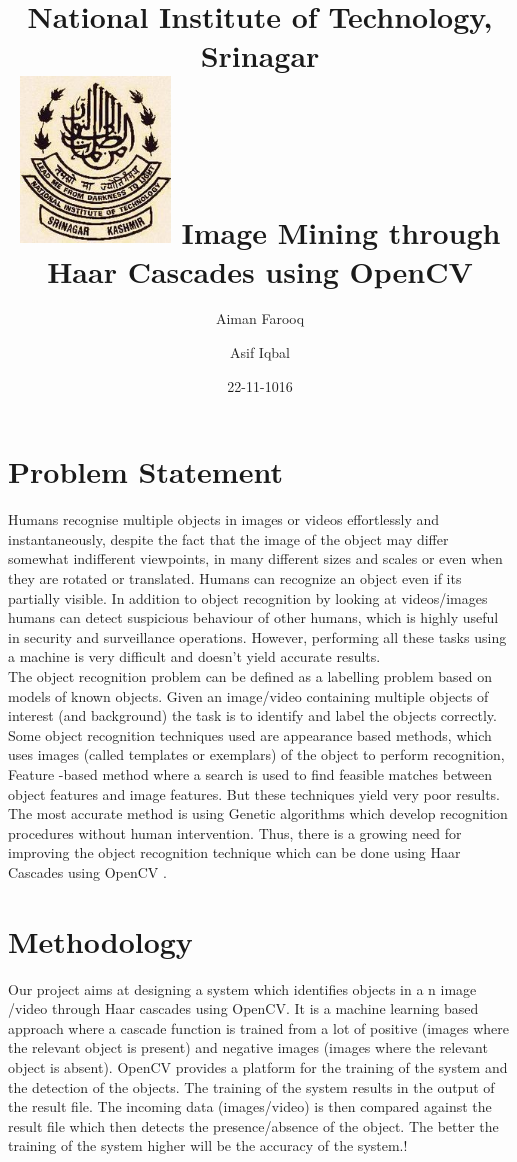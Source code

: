 \documentclass{article}
\title{\textbf{National Institute of Technology, Srinagar}\\
    \vfill
    \includegraphics[width=4cm]{nitlogo.jpg}
    \vfill
Image Mining through Haar Cascades using OpenCV\vspace*{2.0cm}}
\date{22-11-1016}
\author{
  Aiman Farooq
  \and
  Asif Iqbal
}
\begin{document}
\maketitle
\newpage
{}

\tableofcontents
\newpage


\section{Problem Statement}


Humans recognise multiple objects in images or videos effortlessly and instantaneously, despite the fact that the image of the object may differ somewhat indifferent viewpoints, in many different sizes and scales or even when they are rotated or translated. Humans can recognize an object even if its partially visible.  In addition to object recognition by looking at videos/images humans can detect suspicious behaviour of other humans, which is highly useful in security and surveillance operations. However, performing all these tasks using a machine is very difficult and doesn’t yield accurate results. \\

The object recognition problem can be defined as a labelling problem based on models of known objects. Given an image/video containing multiple objects of interest (and background) the task is to identify and label the objects correctly. Some object recognition techniques used are appearance based methods, which uses images (called templates or exemplars) of the object to perform recognition, Feature -based method where a search is used to find feasible matches between object features and image features. But these techniques yield very poor results. The most accurate method is using Genetic algorithms which develop recognition procedures without human intervention. Thus, there is a growing need for improving the object recognition technique which can be done using Haar Cascades using OpenCV \cite{ID:1}.

\section{Methodology}

Our project aims at designing a system which identifies objects in a n image /video through Haar cascades using OpenCV. It is a machine learning based approach where a cascade function is trained from a lot of positive (images where the relevant object is present) and negative images (images where the relevant object is absent). OpenCV provides a platform for the training of the system and the detection of the objects. The training of the system results in the output of the result file. The incoming data (images/video) is then compared against the result file which then detects the presence/absence of the object. The better the training of the system higher will be the accuracy of the system.! 
\end{document}
